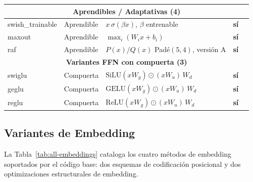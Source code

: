 \begin{longtable}{p{2.6cm}p{1.4cm}p{5.2cm}p{0.9cm}p{2.0cm}}
\multicolumn{5}{c}{\textbf{Aprendibles / Adaptativas (4)}} \\
\midrule
swish\_trainable & Aprendible & $x\,\sigma(\beta x)$, $\beta$ entrenable & \textbf{sí} & \citep{ramachandran2017swish} \\
maxout & Aprendible & $\max_{i}(W_i x+b_i)$ & \textbf{sí} & \citep{goodfellow2013maxout} \\
raf & Aprendible & $P(x)/Q(x)$ Padé$(5,4)$, versión A & \textbf{sí} & \citep{fang2023raft} \\
\midrule

\multicolumn{5}{c}{\textbf{Variantes FFN con compuerta (3)}} \\
\midrule
swiglu & Compuerta & $\text{SiLU}(xW_g)\odot(xW_u)\,W_d$ & \textbf{sí} & \citep{shazeer2020glu} \\
geglu & Compuerta & $\text{GELU}(xW_g)\odot(xW_u)\,W_d$ & \textbf{sí} & \citep{shazeer2020glu} \\
reglu & Compuerta & $\text{ReLU}(xW_g)\odot(xW_u)\,W_d$ & \textbf{sí} & \citep{shazeer2020glu} \\
\bottomrule
\end{longtable}
\normalsize

\subsection{Variantes de Embedding}

La Tabla~\ref{tab:all-embeddings} cataloga los cuatro métodos de embedding soportados por el código base: dos esquemas de codificación posicional y dos optimizaciones estructurales de embedding.

